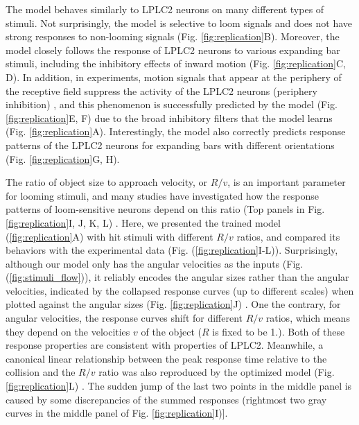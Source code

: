 \documentclass[pdftex,9pt,lineno]{elife}
\begin{document}
The model behaves similarly to LPLC2 neurons on many different types of stimuli. Not surprisingly, the model is selective to loom signals and does not have strong responses to non-looming signals (Fig. \ref{fig:replication}B). Moreover, the model closely follows the response of LPLC2 neurons to various expanding bar stimuli, including the inhibitory effects of inward motion (Fig. \ref{fig:replication}C, D). In addition, in experiments, motion signals that appear at the periphery of the receptive field suppress the activity of the LPLC2 neurons (periphery inhibition) \citep{klapoetke2017ultra}, and this phenomenon is successfully predicted by the model (Fig. \ref{fig:replication}E, F) due to the broad inhibitory filters that the model learns (Fig. \ref{fig:replication}A). Interestingly, the model also correctly predicts response patterns of the LPLC2 neurons for expanding bars with different orientations (Fig. \ref{fig:replication}G, H). 

The ratio of object size to approach velocity, or $R/v$, is an important parameter for looming stimuli, and many studies have investigated how the response patterns of loom-sensitive neurons depend on this ratio (Top panels in Fig. \ref{fig:replication}I, J, K, L) \citep{gabbiani1999computation,von2017feature,ache2019neural}. Here, we presented the trained model (\ref{fig:replication}A) with hit stimuli with different $R/v$ ratios, and compared its behaviors with the experimental data (Fig. (\ref{fig:replication}I-L)). Surprisingly, although our model only has the angular velocities as the inputs (Fig. (\ref{fig:stimuli_flow})), it reliably encodes the angular sizes rather than the angular velocities, indicated by the collapsed response curves (up to different scales) when plotted against the angular sizes (Fig. \ref{fig:replication}J) \citep{von2017feature}. One the contrary, for angular velocities, the response curves shift for different $R/v$ ratios, which means they depend on the velocities $v$ of the object ($R$ is fixed to be 1.). Both of these response properties are consistent with properties of LPLC2. Meanwhile, a canonical linear relationship between the peak response time relative to the collision and the $R/v$ ratio was also reproduced by the optimized model (Fig. \ref{fig:replication}L) \citep{gabbiani1999computation,ache2019neural}. The sudden jump of the last two points in the middle panel is caused by some discrepancies of the summed responses (rightmost two gray curves in the middle panel of Fig. \ref{fig:replication}I)]. 
\end{document}
